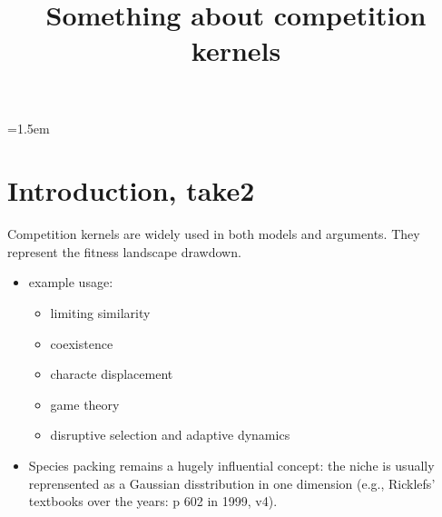 \documentclass[a4paper,11pt]{article}
\title{Something about competition kernels}
\author{}
\date{}
\affiliation{}
\begin{document}

\mstitlepage
\parindent=1.5em
\addtolength{\parskip}{.3em}


\section{Introduction, take2}

Competition kernels are widely used in both models and arguments.
They represent the fitness landscape drawdown.
\begin{itemize}
\item example usage:
  \begin{itemize}
  \item limiting similarity \citet{MacArthur-1967}
  \item coexistence
  \item characte displacement \citep[e.g.,][]{Taper-1985, Case-2000,
      Goldberg-2006}
  \item game theory \citep[e.g.,][]{Brown-1987-140, Brown-1987}
  \item disruptive selection and adaptive dynamics \citep{Dieckmann-1999}
  \end{itemize}
\item Species packing remains a hugely influential concept: the
  niche is usually reprensented as a Gaussian disstribution in one
  dimension (e.g., Ricklefs' textbooks over the years: p 602 in
  1999, v4).
\end{itemize}
\end{document}
